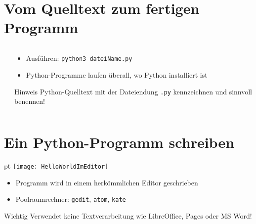\section{Vom Quelltext zum fertigen Programm}
\begin{frame}
	\slidehead

	\begin{columns}[T]
		\begin{column}{.4\textwidth}
		\end{column}
		\begin{column}{.6\textwidth}
			\begin{itemize}
				\item Ausführen: \texttt{python3 dateiName.py}
				\item Python-Programme laufen überall, wo Python installiert ist
			\end{itemize}
			\vspace{2.5cm}
			\begin{block}{Hinweis}
				Python-Quelltext mit der Dateiendung \texttt{.py} kennzeichnen und sinnvoll benennen!
			\end{block}
		\end{column}
	\end{columns}
\end{frame}

\section{Ein Python-Programm schreiben}
\begin{frame}
	\slidehead

	\begin{center}
		 pt
		\texttt{[image: HelloWorldImEditor]}
	\end{center}

	\begin{itemize}
		\item Programm wird in einem herkömmlichen Editor geschrieben
		\item Poolraumrechner: \texttt{gedit}, \texttt{atom}, \texttt{kate}
	\end{itemize}
	\begin{alertblock}{Wichtig}
		Verwendet keine Textverarbeitung wie LibreOffice, Pages oder MS Word!
	\end{alertblock}
\end{frame}

